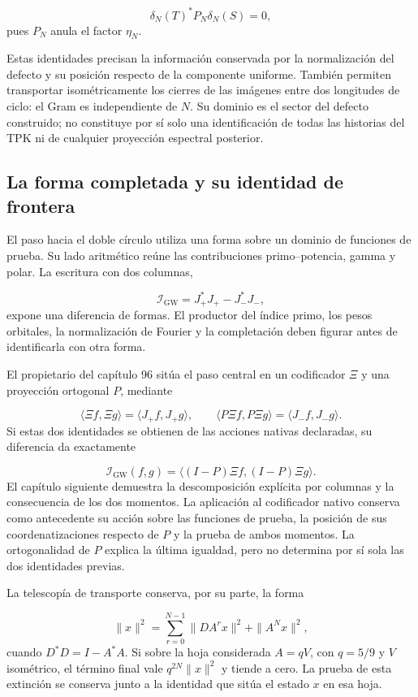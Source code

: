 \[
\delta_N(T)^*P_N\delta_N(S)=0,
\]
pues \(P_N\) anula el factor \(\eta_N\).

Estas identidades precisan la información conservada por la normalización del defecto y su posición respecto de la componente uniforme. También permiten transportar isométricamente los cierres de las imágenes entre dos longitudes de ciclo: el Gram es independiente de \(N\). Su dominio es el sector del defecto construido; no constituye por sí solo una identificación de todas las historias del TPK ni de cualquier proyección espectral posterior.

\subsection{La forma completada y su identidad de frontera}
El paso hacia el doble círculo utiliza una forma sobre un dominio de funciones de prueba. Su lado aritmético reúne las contribuciones primo–potencia, gamma y polar. La escritura con dos columnas,

\[
\mathscr I_{\mathrm{GW}}=J_+^*J_+-J_-^*J_-,
\]
expone una diferencia de formas. El productor del índice primo, los pesos orbitales, la normalización de Fourier y la completación deben figurar antes de identificarla con otra forma.

El propietario del capítulo 96 sitúa el paso central en un codificador $\Xi$ y una proyección ortogonal $P$, mediante

\[
\langle\Xi f,\Xi g\rangle=\langle J_+f,J_+g\rangle,
\qquad
\langle P\Xi f,P\Xi g\rangle=\langle J_-f,J_-g\rangle.
\]
Si estas dos identidades se obtienen de las acciones nativas declaradas, su diferencia da exactamente

\[
\mathscr I_{\mathrm{GW}}(f,g)
=\langle(I-P)\Xi f,(I-P)\Xi g\rangle.
\]
El capítulo siguiente demuestra la descomposición explícita por columnas y la consecuencia de los dos momentos. La aplicación al codificador nativo conserva como antecedente su acción sobre las funciones de prueba, la posición de sus coordenatizaciones respecto de $P$ y la prueba de ambos momentos. La ortogonalidad de $P$ explica la última igualdad, pero no determina por sí sola las dos identidades previas.

La telescopía de transporte conserva, por su parte, la forma

\[
\|x\|^2=\sum_{r=0}^{N-1}\|DA^rx\|^2+\|A^Nx\|^2,
\]
cuando $D^*D=I-A^*A$. Si sobre la hoja considerada $A=qV$, con $q=5/9$ y $V$ isométrico, el término final vale $q^{2N}\|x\|^2$ y tiende a cero. La prueba de esta extinción se conserva junto a la identidad que sitúa el estado $x$ en esa hoja.

